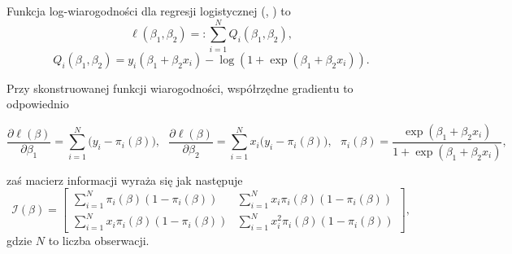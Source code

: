 Funkcja log-wiarogodności dla regresji logistycznej (\cite{czepiel}, \cite{dobson}) to
\begin{equation}\label{logglm}
\ell(\beta_1,\beta_2) =: \sum\limits_{i=1}^{N} Q_i(\beta_1,\beta_2), 
\end{equation}
\begin{equation}
Q_i(\beta_1,\beta_2) = y_i(\beta_1+\beta_2x_i) -\log(1+\exp(\beta_1+\beta_2x_i)).
\end{equation}

Przy skonstruowanej funkcji wiarogodności, współrzędne gradientu to odpowiednio

\begin{equation*}
\dfrac{\partial\ell(\beta)}{\partial\beta_1} = \sum\limits_{i=1}^{N}\Big(y_i-\pi_i(\beta)\Big), \ \ \
\dfrac{\partial\ell(\beta)}{\partial\beta_2} = \sum\limits_{i=1}^{N}x_i\Big(y_i-\pi_i(\beta)\Big), \ \ \
\pi_i(\beta) = \frac{\exp(\beta_1+\beta_2x_i)}{1+\exp(\beta_1+\beta_2x_i)},
\end{equation*}

zaś macierz informacji wyraża się jak następuje
\begin{equation}\label{iii}
\mathscr{I}(\beta) = 
\begin{bmatrix}
    \sum\limits_{i=1}^{N}\pi_i(\beta)(1-\pi_i(\beta))       & \sum\limits_{i=1}^{N}x_i\pi_i(\beta)(1-\pi_i(\beta)) \\
\sum\limits_{i=1}^{N}x_i\pi_i(\beta)(1-\pi_i(\beta)) & \sum\limits_{i=1}^{N}x_i^2\pi_i(\beta)(1-\pi_i(\beta)) 
\end{bmatrix},
\end{equation}
gdzie $N$ to liczba obserwacji.

